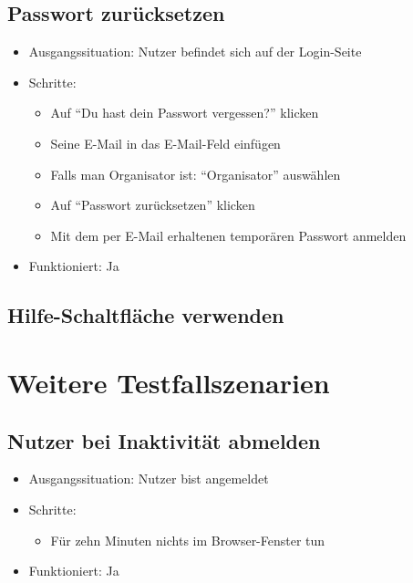 \documentclass[a4paper]{scrreprt}
\begin{document}
            \subsection{Passwort zurücksetzen}
            \begin{itemize}
                \item Ausgangssituation: Nutzer befindet sich auf der Login-Seite
                \item Schritte:
                    \begin{itemize}
                        \item Auf \enquote{Du hast dein Passwort vergessen?} klicken
                        \item Seine E-Mail in das E-Mail-Feld einfügen
                        \item Falls man Organisator ist: \enquote{Organisator} auswählen
                        \item Auf \enquote{Passwort zurücksetzen} klicken
                        \item Mit dem per E-Mail erhaltenen temporären Passwort anmelden
                    \end{itemize}
                \item Funktioniert: Ja
            \end{itemize}

            \subsection{Hilfe-Schaltfläche verwenden}



        \section{Weitere Testfallszenarien}
            \subsection{Nutzer bei Inaktivität abmelden}
            \begin{itemize}
                \item Ausgangssituation: Nutzer bist angemeldet
                \item Schritte:
                    \begin{itemize}
                        \item Für zehn Minuten nichts im Browser-Fenster tun
                    \end{itemize}
                \item Funktioniert: Ja
            \end{itemize}
\end{document}
